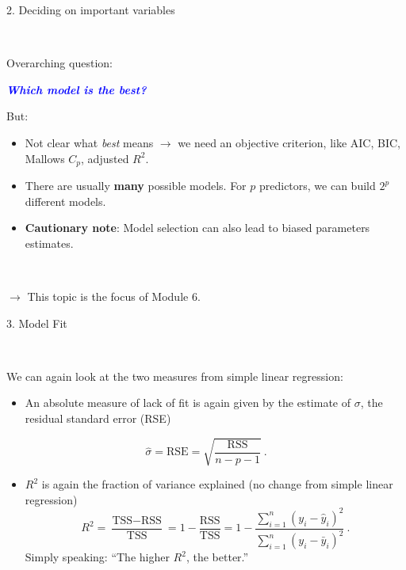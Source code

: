 \documentclass[10pt,ignorenonframetext,]{beamer}
\providecommand{\tightlist}{%
  \setlength{\itemsep}{0pt}\setlength{\parskip}{0pt}}
\begin{document}
\begin{frame}

\begin{block}{2. Deciding on important variables}

\(~\)

Overarching question:

\begin{center}
 \emph{\textcolor{blue}{\bf Which model is the best?}}
\end{center}

But:

\begin{itemize}
\item
  Not clear what \emph{best} means \(\rightarrow\) we need an objective
  criterion, like AIC, BIC, Mallows \(C_p\), adjusted \(R^2\).
\item
  There are usually \textbf{many} possible models. For \(p\) predictors,
  we can build \(2^p\) different models.
\item
  \textbf{Cautionary note}: Model selection can also lead to biased
  parameters estimates.
\end{itemize}

\(~\)

\(\rightarrow\) This topic is the focus of Module 6.

\end{block}

\end{frame}

\begin{frame}

\begin{block}{3. Model Fit}

\(~\)

We can again look at the two measures from simple linear regression:

\begin{itemize}
\tightlist
\item
  An absolute measure of lack of fit is again given by the estimate of
  \(\sigma\), the residual standard error (RSE)
\end{itemize}

\[\hat\sigma = \text{RSE}= \sqrt{ \frac{ \text{RSS}}{n-p-1}} \ . \]

\begin{itemize}
\tightlist
\item
  \(R^2\) is again the fraction of variance explained (no change from
  simple linear regression)
  \[R^2 = \frac{\text{TSS}-\text{RSS}}{\text{TSS}}= 1-\frac{\text{RSS}}{\text{TSS}}=1-\frac{\sum_{i=1}^n(y_i-\hat{y}_i)^2}{\sum_{i=1}^n(y_i-\bar{y}_i)^2} \ .\]
  Simply speaking: ``The higher \(R^2\), the better.''
\end{itemize}

\end{block}

\end{frame}
\end{document}
